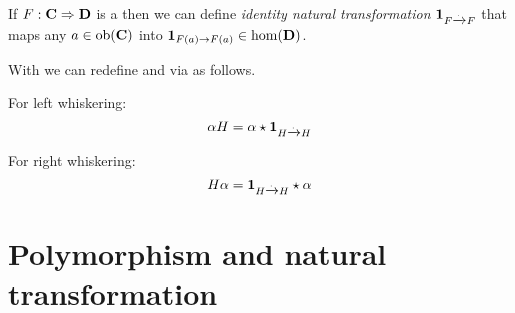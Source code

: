 

\begin{definition}
\label{def:idnt}
If $F: \mathbf{C} \Rightarrow \mathbf{D}$ is a  then we can
define \textit{identity natural transformation}
$\mathbf{1}_{ F \xrightarrow{.} F }$ that maps any  
$a \in \mathrm{ob}(\mathbf{C})$ into  $\mathbf{1}_{ F(a) \to F(a) } \in \mathrm{hom}(\mathbf{D})$.
\end{definition}

\begin{remark}[Whiskering]
\label{rem:whiskering}
With  we can redefine  and
 via  as follows.

For left whiskering:
\begin{equation}
\label{eq:lw}
\alpha H = \alpha \star \mathbf{1}_{ H \xrightarrow{.} H }
\end{equation}

For right whiskering:
\begin{equation}
\label{eq:rw}
H \alpha = \mathbf{1}_{ H \xrightarrow{.} H } \star \alpha
\end{equation}
\end{remark}


\section{Polymorphism and natural transformation}

